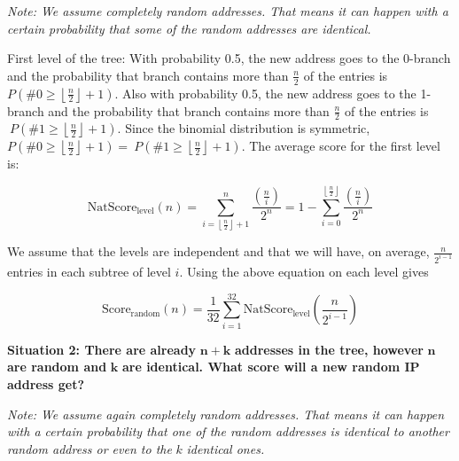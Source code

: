 \emph{Note: We assume completely random addresses. That means it can
happen with a certain probability that some of the random addresses are
identical.}

First level of the tree: With probability 0.5, the new address goes to the 0-branch
and the probability that branch contains more than \(\frac{n}{2}\) of
the entries is
\(P(\# 0 \geq \left\lfloor \frac{n}{2} \right\rfloor + 1)\). Also with
probability 0.5, the new address goes to the 1-branch and the
probability that branch contains more than \(\frac{n}{2}\) of the
entries is\(\ P(\# 1 \geq \left\lfloor \frac{n}{2} \right\rfloor + 1).\)
Since the binomial distribution is symmetric,
\(P\left( \# 0 \geq \left\lfloor \frac{n}{2} \right\rfloor + 1 \right) = \ P(\# 1 \geq \left\lfloor \frac{n}{2} \right\rfloor + 1)\).
The average score for the first level is:

\[\text{NatScore}_{\text{level}}(n) = \sum_{i = \left\lfloor \frac{n}{2} \right\rfloor + 1}^{n}\frac{\left( \frac{n}{i} \right)}{2^{n}} = 1 - \sum_{i = 0}^{\left\lfloor \frac{n}{2} \right\rfloor}\frac{\left( \frac{n}{i} \right)}{2^{n}}\]


We assume that the levels are independent and that we will have, on
average, \(\frac{n}{2^{i - 1}}\) entries in each subtree of level \(i\).
Using the above equation on each level gives

\[\text{Score}_{\text{random}}(n) = \frac{1}{32} \sum_{i = 1}^{32}{\text{NatScore}_{\text{level}}\left( \frac{n}{2^{i - 1}} \right)}\]

\textbf{Situation 2: There are already} \(\mathbf{n + k}\)
\textbf{addresses in the tree, however} \(\mathbf{n}\) \textbf{are
random and} \(\mathbf{k}\) \textbf{are identical. What score will a new
random IP address get?}

\emph{Note: We assume again completely random addresses. That means it can
happen with a certain probability that one of the random addresses is
identical to another random address or even to the} \(k\)
\emph{identical ones.}

